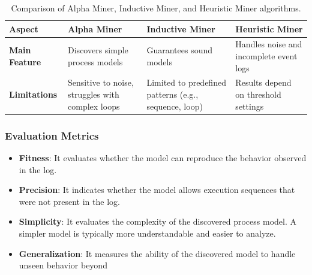 \begin{table}[h!]
    \centering
    \renewcommand{\arraystretch}{1.3} %
    \begin{tabularx}{\textwidth}{|X|X|X|X|}
    \hline
    \textbf{Aspect}          & \textbf{Alpha Miner}                      & \textbf{Inductive Miner}              & \textbf{Heuristic Miner}               \\ \hline
    \textbf{Main Feature}    & Discovers simple process models           & Guarantees sound models               & Handles noise and incomplete event logs \\ \hline
    \textbf{Limitations}     & Sensitive to noise, struggles with complex loops & Limited to predefined patterns (e.g., sequence, loop) & Results depend on threshold settings   \\ \hline
    \end{tabularx}
    \caption{Comparison of Alpha Miner, Inductive Miner, and Heuristic Miner algorithms.}
    \label{tab:comparison}
    \end{table}

\subsubsection{Evaluation Metrics}


\begin{itemize}
    \item \textbf{Fitness}: It evaluates whether the model can reproduce the behavior observed in the log.
    
    \item \textbf{Precision}: It indicates whether the model allows execution sequences that were not present in the log.
    
    \item \textbf{Simplicity}: It evaluates the complexity of the discovered process model. A simpler model is typically more understandable and easier to analyze.
    
    \item \textbf{Generalization}: It measures the ability of the discovered model to handle unseen behavior beyond
\end{itemize}






